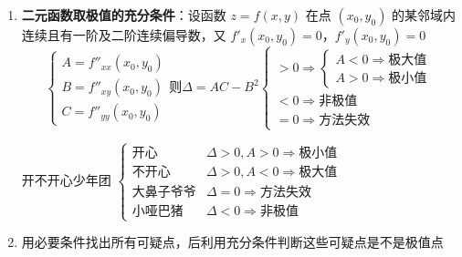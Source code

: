 \documentclass[../book.tex]{subfiles}
\begin{document}
\begin{enumerate}
        \item \textbf{二元函数取极值的充分条件}：设函数 $z = f(x,y)$ 在点 $(x_0, y_0)$ 的某邻域内连续且有一阶及二阶连续偏导数，又 $f'_x(x_0, y_0) = 0$，$f'_y(x_0, y_0) = 0$
        \[
            \begin{cases}
                A = f''_{xx}(x_0, y_0) \\
                B = f''_{xy}(x_0, y_0) \\
                C = f''_{yy}(x_0, y_0)
            \end{cases} \text{则}\Delta = AC - B^2 \begin{cases}
                                                       > 0 \Rightarrow \begin{cases}
                                                                           A < 0 \Rightarrow \text{极大值} \\
                                                                           A > 0 \Rightarrow \text{极小值}
                                                       \end{cases} \\
                                                       < 0 \Rightarrow \text{非极值} \\
                                                       = 0 \Rightarrow \text{方法失效}
            \end{cases}
        \]
        \begin{analysisbox}[判别法记忆口诀]
            \begin{center}
                开不开心少年团 $\begin{cases}
                                    \text{开心} & \Delta > 0, A > 0 \Rightarrow \text{极小值} \\
                                    \text{不开心} & \Delta > 0, A < 0 \Rightarrow \text{极大值} \\
                                    \text{大鼻子爷爷} & \Delta = 0 \Rightarrow \text{方法失效} \\
                                    \text{小哑巴猪} & \Delta < 0 \Rightarrow \text{非极值}
                \end{cases}$
            \end{center}
        \end{analysisbox}
        \item 用必要条件找出所有可疑点，后利用充分条件判断这些可疑点是不是极值点
    \end{enumerate}
\end{document}
